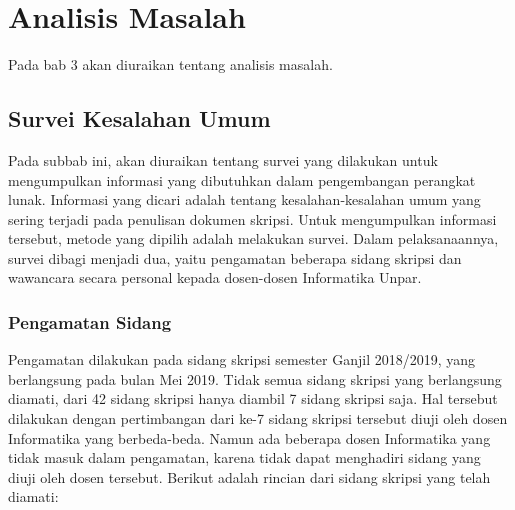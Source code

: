 \chapter{Analisis Masalah}
\label{chap:analisis}

Pada bab 3 akan diuraikan tentang analisis masalah.

\section{Survei Kesalahan Umum}
\label{sec:survei}
Pada subbab ini, akan diuraikan tentang survei yang dilakukan untuk mengumpulkan informasi yang dibutuhkan dalam pengembangan perangkat lunak. Informasi yang dicari adalah tentang kesalahan-kesalahan umum yang sering terjadi pada penulisan dokumen skripsi. Untuk mengumpulkan informasi tersebut, metode yang dipilih adalah melakukan survei. Dalam pelaksanaannya, survei dibagi menjadi dua, yaitu pengamatan beberapa sidang skripsi dan wawancara secara personal kepada dosen-dosen Informatika Unpar. 

\subsection{Pengamatan Sidang}
Pengamatan dilakukan pada sidang skripsi semester Ganjil 2018/2019, yang berlangsung pada bulan Mei 2019. Tidak semua sidang skripsi yang berlangsung diamati, dari 42 sidang skripsi hanya diambil 7 sidang skripsi saja. Hal tersebut dilakukan dengan pertimbangan dari ke-7 sidang skripsi tersebut diuji oleh dosen Informatika yang berbeda-beda. Namun ada beberapa dosen Informatika yang tidak masuk dalam pengamatan, karena tidak dapat menghadiri sidang yang diuji oleh dosen tersebut. Berikut adalah rincian dari sidang skripsi yang telah diamati:

